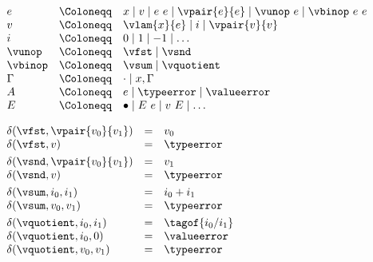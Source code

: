 {\flushleft

$\begin{array}{l c l}
  e & \Coloneqq & x \mid v \mid e~e \mid \vpair{e}{e} \mid \vunop~e \mid \vbinop~e~e
\\
  v & \Coloneqq & \vlam{x}{e} \mid i \mid \vpair{v}{v}
\\
  i & \Coloneqq & 0 \mid 1 \mid -1 \mid \ldots
\\
  \vunop & \Coloneqq & \vfst \mid \vsnd
\\
  \vbinop & \Coloneqq & \vsum \mid \vquotient
\\
  \Gamma & \Coloneqq & \cdot \mid x,\Gamma
\\
  A & \Coloneqq & e \mid \typeerror \mid \valueerror
\\
  E & \Coloneqq & \bullet \mid E~e \mid v~E \mid \ldots
\end{array}$

\medskip
{}
\begin{mathpar}







\end{mathpar}

\medskip

$\begin{array}{l c l}
  \delta(\vfst, \vpair{v_0}{v_1}) & = & v_0
\\
  \delta(\vfst, v) & = & \typeerror
\\[0.8ex]
  \delta(\vsnd, \vpair{v_0}{v_1}) & = & v_1
\\
  \delta(\vsnd, v) & = & \typeerror
\\[0.8ex]
  \delta(\vsum, i_0, i_1) & = & i_0 + i_1
\\
  \delta(\vsum, v_0, v_1) & = & \typeerror
\\[0.8ex]
  \delta(\vquotient, i_0, i_1) & = & \tagof{i_0 / i_1}
\\
  \delta(\vquotient, i_0, 0) & = & \valueerror
\\
  \delta(\vquotient, v_0, v_1) & = & \typeerror
\end{array}$

}

